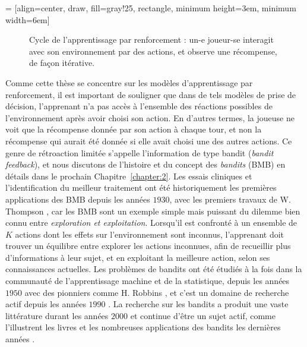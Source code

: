 \begin{resume_fr}
 = [align=center, draw, fill=gray!25, rectangle, minimum height=3em, minimum width=6em]
\begin{figure}[h!]
    \centering
\caption{Cycle de l'apprentissage par renforcement : un-e joueur-se interagit avec son environnement par des actions, et observe une récompense, de façon itérative.}
\label{fig:1:ReinforcementLearningCycle_enFr}
\end{figure}


Comme cette thèse se concentre sur les modèles d'apprentissage par renforcement,
il est important de souligner que dans de tels modèles de prise de décision, l'apprenant n'a pas accès à l'ensemble des réactions possibles de l'environnement après avoir choisi son action.
%
En d'autres termes, la joueuse ne voit que la récompense donnée par son action à chaque tour, et non la récompense qui aurait été donnée si elle avait choisi une des autres actions.
Ce genre de rétroaction limitée s'appelle l'information de type bandit (\emph{bandit feedback}), et nous discutons de l'histoire et du concept des \emph{bandits} (BMB) en détails dans le prochain Chapitre~\ref{chapter:2}.
Les essais cliniques et l'identification du meilleur traitement ont été historiquement les premières applications des BMB depuis les années $1930$, avec les premiers travaux de W. Thompson \cite{Thompson33},
%
car les BMB sont un exemple simple mais puissant du dilemme bien connu entre \emph{exploration et exploitation}.
Lorsqu'il est confronté à un ensemble de $K$ actions dont les effets sur l'environnement sont inconnus, l'apprenant doit trouver un équilibre entre
explorer les actions inconnues, afin de recueillir plus d'informations à leur sujet,
et en exploitant la meilleure action, selon ses connaissances actuelles.
%
Les problèmes de bandits ont été étudiés à la fois dans la communauté de l'apprentissage machine et de la statistique, depuis les années $1950$ avec des pionniers comme H. Robbins \cite{Robbins52}, et c'est un domaine de recherche actif depuis les années $1990$ \cite{Anantharam87a,Anantharam87b,auer1995gambling,Agrawal95}.
La recherche sur les bandits a produit une vaste littérature durant les années $2000$ \cite{Auer02,Auer02NonStochastic,Audibert2009minimax} et continue d'être un sujet actif, comme l'illustrent les livres \cite{Bubeck12,LattimoreBanditAlgorithmsBook,Slivkins2019} et les nombreuses applications des bandits les dernières années \cite{bouneffouf2019survey}.



\end{resume_fr}

